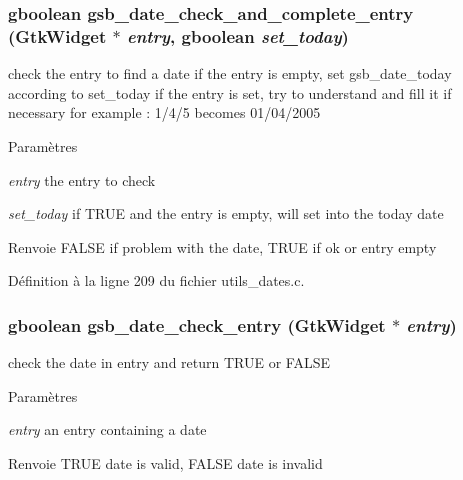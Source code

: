\subsubsection[{gsb\_\-date\_\-check\_\-and\_\-complete\_\-entry}]{\setlength{\rightskip}{0pt plus 5cm}gboolean gsb\_\-date\_\-check\_\-and\_\-complete\_\-entry (GtkWidget $\ast$ {\em entry}, \/  gboolean {\em set\_\-today})}\label{utils__dates_8h_af09f2167efc12cc516f17c3c04c05f2f}
check the entry to find a date if the entry is empty, set gsb\_\-date\_\-today according to set\_\-today if the entry is set, try to understand and fill it if necessary for example : 1/4/5 becomes 01/04/2005


\begin{DoxyParams}{Paramètres}
\item[{\em entry}]the entry to check \item[{\em set\_\-today}]if TRUE and the entry is empty, will set into the today date\end{DoxyParams}
\begin{DoxyReturn}{Renvoie}
FALSE if problem with the date, TRUE if ok or entry empty 
\end{DoxyReturn}


Définition à la ligne 209 du fichier utils\_\-dates.c.

\subsubsection[{gsb\_\-date\_\-check\_\-entry}]{\setlength{\rightskip}{0pt plus 5cm}gboolean gsb\_\-date\_\-check\_\-entry (GtkWidget $\ast$ {\em entry})}\label{utils__dates_8h_a02184736d75dd242e3c5c3b4a89efd81}
check the date in entry and return TRUE or FALSE


\begin{DoxyParams}{Paramètres}
\item[{\em entry}]an entry containing a date\end{DoxyParams}
\begin{DoxyReturn}{Renvoie}
TRUE date is valid, FALSE date is invalid 
\end{DoxyReturn}



